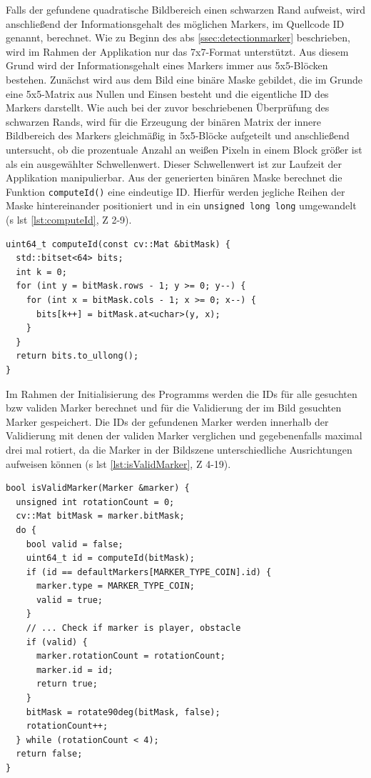 \noindent Falls der gefundene quadratische Bildbereich einen schwarzen Rand aufweist, wird anschließend der Informationsgehalt des möglichen Markers, im Quellcode \glqq ID\grqq{} genannt, berechnet. Wie zu Beginn des \acs{abs} \ref{ssec:detectionmarker} beschrieben, wird im Rahmen der Applikation nur das 7x7-Format unterstützt. Aus diesem Grund wird der Informationsgehalt eines Markers immer aus 5x5-Blöcken bestehen. Zunächst wird aus dem Bild eine binäre Maske gebildet, die im Grunde eine 5x5-Matrix aus Nullen und Einsen besteht und die eigentliche ID des Markers darstellt. Wie auch bei der zuvor beschriebenen Überprüfung des schwarzen Rands, wird für die Erzeugung der binären Matrix der innere Bildbereich des Markers gleichmäßig in 5x5-Blöcke aufgeteilt und anschließend untersucht, ob die prozentuale Anzahl an weißen Pixeln in einem Block größer ist als ein ausgewählter Schwellenwert. Dieser Schwellenwert ist zur Laufzeit der Applikation manipulierbar. Aus der generierten binären Maske berechnet die Funktion \texttt{computeId()} eine eindeutige ID. Hierfür werden jegliche Reihen der Maske hintereinander positioniert und in ein \texttt{unsigned long long} umgewandelt (\acs{s} \acs{lst} \ref{lst:computeId}, \acs{Z} 2-9).

\newpage

\begin{lstlisting}[caption={Die Funktion \texttt{detectormarkerbased.cpp/computeId();} konvertiert aus einer gegebenen binären Maske eine eindeutige ID}, label={lst:computeId}]
uint64_t computeId(const cv::Mat &bitMask) {
  std::bitset<64> bits;
  int k = 0;
  for (int y = bitMask.rows - 1; y >= 0; y--) {
    for (int x = bitMask.cols - 1; x >= 0; x--) {
      bits[k++] = bitMask.at<uchar>(y, x);
    }
  }
  return bits.to_ullong();
}
\end{lstlisting}

\noindent Im Rahmen der Initialisierung des Programms werden die IDs für alle gesuchten \acs{bzw} validen Marker berechnet und für die Validierung der im Bild gesuchten Marker gespeichert. Die IDs der gefundenen Marker werden innerhalb der Validierung mit denen der validen Marker verglichen und gegebenenfalls maximal drei mal rotiert, da die Marker in der Bildszene unterschiedliche Ausrichtungen aufweisen können (\acs{s} \acs{lst} \ref{lst:isValidMarker}, \acs{Z} 4-19).

\begin{lstlisting}[caption={Die Funktion \texttt{detectormarkerbased.cpp/isValidMarker();} überprüft, ob der übergebene Marker gesucht wird \acs{bzw} valide ist}, label={lst:isValidMarker}]
bool isValidMarker(Marker &marker) {
  unsigned int rotationCount = 0;
  cv::Mat bitMask = marker.bitMask;
  do {
    bool valid = false;
    uint64_t id = computeId(bitMask);
    if (id == defaultMarkers[MARKER_TYPE_COIN].id) {
      marker.type = MARKER_TYPE_COIN;
      valid = true;
    }
    // ... Check if marker is player, obstacle
    if (valid) {
      marker.rotationCount = rotationCount;
      marker.id = id;
      return true;
    }
    bitMask = rotate90deg(bitMask, false);
    rotationCount++;
  } while (rotationCount < 4);
  return false;
}
\end{lstlisting}

